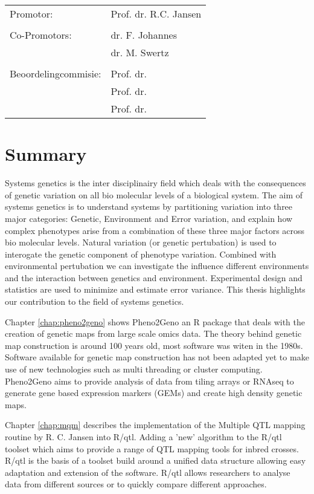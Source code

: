 \documentclass[8pt, twoside]{book}
\begin{document}
\newpage
\thispagestyle{empty}
\begin{tabular}{ l l }
Promotor:             & Prof. dr. R.C. Jansen \\
                      & \\
Co-Promotors:         & dr. F. Johannes \\
                      & dr. M. Swertz \\
                      & \\
Beoordelingcommisie:  & Prof. dr. \\
                      & Prof. dr. \\
                      & Prof. dr. \\
\end{tabular}
\tableofcontents
\newpage
\chapter*{Summary}\vspace{-30pt}
Systems genetics is the inter disciplinairy field which deals with the consequences of genetic 
variation on all bio molecular levels of a biological system. The aim of systems genetics is to 
understand systems by partitioning variation into three major categories: Genetic, Environment 
and Error variation, and explain how complex phenotypes arise from a combination of these three 
major factors across bio molecular levels.  Natural variation (or genetic pertubation) is used 
to interogate the genetic component of phenotype variation. Combined with environmental 
pertubation we can investigate the influence different environments and the interaction between 
genetics and environment. Experimental design and statistics are used to minimize and estimate 
error variance. This thesis highlights our contribution to the field of systems genetics.

Chapter \ref{chap:pheno2geno} shows Pheno2Geno an R package that deals with the creation of 
genetic maps from large scale omics data. The theory behind genetic map construction is around 
100 years old, most software was witen in the 1980s. Software available for genetic map construction 
has not been adapted yet to make use of new technologies such as multi threading or cluster 
computing. Pheno2Geno aims to provide analysis of data from tiling arrays or RNAseq to generate 
gene based expression markers (GEMs) and create high density genetic maps.

Chapter \ref{chap:mqm} describes the implementation of the Multiple QTL mapping routine 
by R. C. Jansen into R/qtl. Adding a 'new' algorithm to the R/qtl toolset which aims to 
provide a range of QTL mapping tools for inbred crosses. R/qtl is the basis of a toolset 
build around a unified data structure allowing easy adaptation and extension of the software. 
R/qtl allows researchers to analyse data from different sources or to quickly compare 
different approaches.
\end{document}
